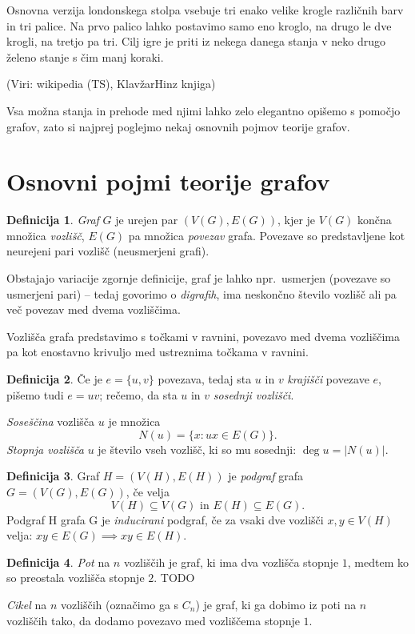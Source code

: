 \documentclass[12pt,a4paper]{amsart}
\theoremstyle{definition} %
\newtheorem{definicija}{Definicija}[section]
\theoremstyle{plain} %
\newcommand{\graf}[1]{\ensuremath{#1 = (V(#1), E(#1))}}
\DeclareMathOperator {\stopnja} {deg}
\begin{document}
Osnovna verzija londonskega stolpa vsebuje tri enako velike krogle različnih barv in tri palice. Na prvo palico lahko postavimo samo eno kroglo, na drugo le dve krogli, na tretjo pa tri. Cilj igre je priti iz nekega danega stanja v neko drugo želeno stanje s čim manj koraki.

(Viri: wikipedia (TS), KlavžarHinz knjiga)

Vsa možna stanja in prehode med njimi lahko zelo elegantno opišemo s pomočjo grafov, zato si najprej poglejmo nekaj osnovnih pojmov teorije grafov.

\section{Osnovni pojmi teorije grafov}

\begin{definicija}
	\emph{Graf} $G$ je urejen par $(V(G), E(G))$, kjer je $V(G)$ končna množica \emph{vozlišč}, $E(G)$ pa množica \emph{povezav} grafa. Povezave so predstavljene kot neurejeni pari vozlišč (neusmerjeni grafi).
\end{definicija}

Obstajajo variacije zgornje definicije, graf je lahko npr.\ usmerjen (povezave so usmerjeni pari) -- tedaj govorimo o \emph{digrafih}, ima neskončno število vozlišč ali pa več povezav med dvema vozliščima.

Vozlišča grafa predstavimo s točkami v ravnini, povezavo med dvema vozliščima pa kot enostavno krivuljo med ustreznima točkama v ravnini.

\begin{definicija}
	Če je $e = \{ u,v \}$ povezava, tedaj sta $u$ in $v$ \emph{krajišči} povezave $e$, pišemo tudi $e = uv$; rečemo, da sta $u$ in $v$ \emph{sosednji vozlišči}.
	
	\emph{Soseščina} vozlišča $u$ je množica 
	\[ N(u) = \{ x\colon ux \in E(G) \} .\]
	\emph{Stopnja vozlišča} $u$ je število vseh vozlišč, ki so mu sosednji: $\stopnja u = |N(u)|$.
\end{definicija}

\begin{definicija}
	Graf $\graf{H}$ je \emph{podgraf} grafa $\graf{G}$, če velja 
	\[ V(H) \subseteq V(G) \text{ in } E(H) \subseteq E(G). \]
	Podgraf H grafa G je \emph{inducirani} podgraf, če za vsaki dve vozlišči $x,y\in V(H)$ velja: $xy \in E(G) \implies xy \in E(H)$.
\end{definicija}

\begin{definicija}
	\emph{Pot} na $n$ vozliščih je graf, ki ima dva vozlišča stopnje $1$, medtem ko so preostala vozlišča stopnje $2$. TODO
	
	\emph{Cikel} na $n$ vozliščih (označimo ga s $C_n$) je graf, ki ga dobimo iz poti na $n$ vozliščih tako, da dodamo povezavo med vozliščema stopnje $1$.
\end{definicija}
\end{document}
